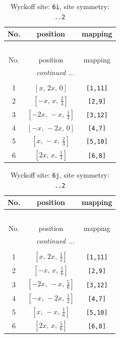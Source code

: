 \documentclass[fleqn,8pt]{jsarticle}
\begin{document}
\renewcommand{\arraystretch}{1.2}
\begin{longtable}{ccc}
\caption{Wyckoff site: {\tt 6i}, site symmetry: {\tt ..2}}
 \\
 \hline \hline
No. & position & mapping \\ \hline \endfirsthead

\multicolumn{2}{l}{\tablename\ \thetable{}} \\
 \hline \hline
No. & position & mapping \\ \hline \endhead

 \hline \hline
\multicolumn{2}{r}{\footnotesize\it continued ...} \\ \endfoot

 \hline \hline
\multicolumn{2}{r}{} \\ \endlastfoot

1 & $\left[ x,\, 2 x,\, 0 \right]$ & {\tt [1,11]} \\ \hline
2 & $\left[ - x,\, x,\, \frac{2}{3} \right]$ & {\tt [2,9]} \\ \hline
3 & $\left[ - 2 x,\, - x,\, \frac{1}{3} \right]$ & {\tt [3,12]} \\ \hline
4 & $\left[ - x,\, - 2 x,\, 0 \right]$ & {\tt [4,7]} \\ \hline
5 & $\left[ x,\, - x,\, \frac{2}{3} \right]$ & {\tt [5,10]} \\ \hline
6 & $\left[ 2 x,\, x,\, \frac{1}{3} \right]$ & {\tt [6,8]} \\
\end{longtable}
\renewcommand{\arraystretch}{1.2}
\begin{longtable}{ccc}
\caption{Wyckoff site: {\tt 6j}, site symmetry: {\tt ..2}}
 \\
 \hline \hline
No. & position & mapping \\ \hline \endfirsthead

\multicolumn{2}{l}{\tablename\ \thetable{}} \\
 \hline \hline
No. & position & mapping \\ \hline \endhead

 \hline \hline
\multicolumn{2}{r}{\footnotesize\it continued ...} \\ \endfoot

 \hline \hline
\multicolumn{2}{r}{} \\ \endlastfoot

1 & $\left[ x,\, 2 x,\, \frac{1}{2} \right]$ & {\tt [1,11]} \\ \hline
2 & $\left[ - x,\, x,\, \frac{1}{6} \right]$ & {\tt [2,9]} \\ \hline
3 & $\left[ - 2 x,\, - x,\, \frac{5}{6} \right]$ & {\tt [3,12]} \\ \hline
4 & $\left[ - x,\, - 2 x,\, \frac{1}{2} \right]$ & {\tt [4,7]} \\ \hline
5 & $\left[ x,\, - x,\, \frac{1}{6} \right]$ & {\tt [5,10]} \\ \hline
6 & $\left[ 2 x,\, x,\, \frac{5}{6} \right]$ & {\tt [6,8]} \\
\end{longtable}
\end{document}

